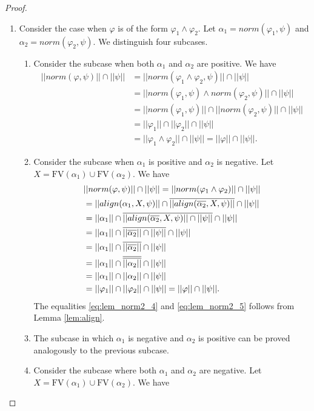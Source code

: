 \documentclass{lmcs}
\def\norm{norm}
\def\al{align}
\def\FV{\textrm{FV}}
\begin{document}
\begin{proof}
\begin{enumerate}
\begin{align}
\end{align} 
\item Consider the case when $\varphi$ is of the form $\varphi_1\wedge\varphi_2$. Let $\alpha_1=\norm(\varphi_1,\psi)$ and $\alpha_2=\norm(\varphi_2,\psi)$. We distinguish four subcases.
\begin{enumerate}
\item Consider the subcase when both $\alpha_1$ and $\alpha_2$ are positive. We have
\begin{align*}
||\norm(\varphi,\psi)||\cap||\psi||&= ||\norm(\varphi_1\wedge\varphi_2,\psi)||\cap||\psi||\\
&=||\norm(\varphi_1,\psi)\wedge\norm(\varphi_2,\psi)||\cap||\psi||\\
&=||\norm(\varphi_1,\psi)||\cap||\norm(\varphi_2,\psi)||\cap||\psi||\\
&=||\varphi_1||\cap||\varphi_2||\cap||\psi||\\
&=||\varphi_1\wedge\varphi_2||\cap||\psi||=||\varphi||\cap||\psi||.
\end{align*} 
\item Consider the subcase when $\alpha_1$ is positive and $\alpha_2$ is negative. Let $X=\FV(\alpha_1)\cup\FV(\alpha_2)$. We have
\begin{align}
&||\norm(\varphi,\psi)||\cap||\psi||=||\norm(\varphi_1\wedge\varphi_2)||\cap||\psi||\notag\\
&=||\al(\alpha_1,X,\psi)||\cap\overline{||\al(\overline{\alpha_2},X,\psi)||} \cap||\psi||\notag\\
&=||\alpha_1||\cap\overline{||\al(\overline{\alpha_2},X,\psi)||\cap||\psi||} \cap||\psi||\label{eq:lem_norm2_4}\\
&=||\alpha_1||\cap\overline{||\overline{\alpha_2}||\cap||\psi||} \cap||\psi||\label{eq:lem_norm2_5}\\
&=||\alpha_1||\cap\overline{||\overline{\alpha_2}||} \cap||\psi||\notag\\
&=||\alpha_1||\cap\overline{\overline{||\alpha_2||}} \cap||\psi||\notag\\
&=||\alpha_1||\cap||\alpha_2|| \cap||\psi||\notag\\
&=||\varphi_1||\cap||\varphi_2|| \cap||\psi||=||\varphi||\cap||\psi||.\notag
\end{align}
The equalities \eqref{eq:lem_norm2_4} and \eqref{eq:lem_norm2_5} follows from Lemma \ref{lem:align}. 
\item The subcase in which $\alpha_1$ is negative and $\alpha_2$ is positive can be proved analogously to the previous subcase.
\item Consider the subcase where both $\alpha_1$ and $\alpha_2$ are negative.  Let $X=\FV(\alpha_1)\cup\FV(\alpha_2)$.  We have

\end{enumerate}
\end{enumerate}
\end{proof}
\end{document}
